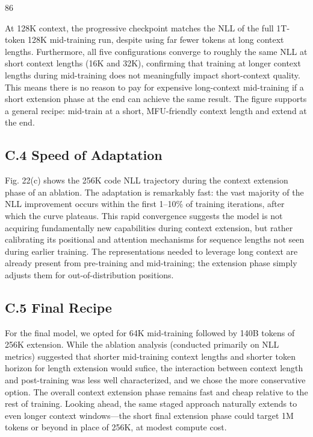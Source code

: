 \documentclass[
  10
]{article}
\begin{document}
86

At 128K context, the progressive checkpoint matches the NLL of the full
1T-token 128K mid-training run, despite using far fewer tokens at long
context lengths. Furthermore, all five configurations converge to
roughly the same NLL at short context lengths (16K and 32K), confirming
that training at longer context lengths during mid-training does not
meaningfully impact short-context quality. This means there is no reason
to pay for expensive long-context mid-training if a short extension
phase at the end can achieve the same result. The figure supports a
general recipe: mid-train at a short, MFU-friendly context length and
extend at the end.

\subsection{C.4 Speed of Adaptation}\label{c.4-speed-of-adaptation}

Fig. 22(c) shows the 256K code NLL trajectory during the context
extension phase of an ablation. The adaptation is remarkably fast: the
vast majority of the NLL improvement occurs within the first 1--10\% of
training iterations, after which the curve plateaus. This rapid
convergence suggests the model is not acquiring fundamentally new
capabilities during context extension, but rather calibrating its
positional and attention mechanisms for sequence lengths not seen during
earlier training. The representations needed to leverage long context
are already present from pre-training and mid-training; the extension
phase simply adjusts them for out-of-distribution positions.

\subsection{C.5 Final Recipe}\label{c.5-final-recipe}

For the final model, we opted for 64K mid-training followed by 140B
tokens of 256K extension. While the ablation analysis (conducted
primarily on NLL metrics) suggested that shorter mid-training context
lengths and shorter token horizon for length extension would sufice, the
interaction between context length and post-training was less well
characterized, and we chose the more conservative option. The overall
context extension phase remains fast and cheap relative to the rest of
training. Looking ahead, the same staged approach naturally extends to
even longer context windows---the short final extension phase could
target 1M tokens or beyond in place of 256K, at modest compute cost.
\end{document}

